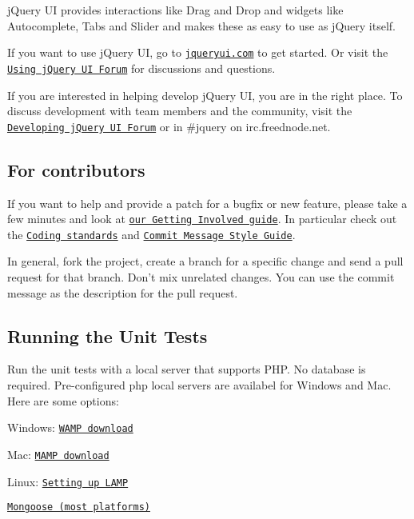 j\-Query U\-I provides interactions like Drag and Drop and widgets like Autocomplete, Tabs and Slider and makes these as easy to use as j\-Query itself.

If you want to use j\-Query U\-I, go to \href{http://jqueryui.com}{\tt jqueryui.\-com} to get started. Or visit the \href{http://forum.jquery.com/using-jquery-ui}{\tt Using j\-Query U\-I Forum} for discussions and questions.

If you are interested in helping develop j\-Query U\-I, you are in the right place. To discuss development with team members and the community, visit the \href{http://forum.jquery.com/developing-jquery-ui}{\tt Developing j\-Query U\-I Forum} or in \#jquery on irc.\-freednode.\-net.

\subsection*{For contributors }

If you want to help and provide a patch for a bugfix or new feature, please take a few minutes and look at \href{http://wiki.jqueryui.com/w/page/35263114/Getting-Involved}{\tt our Getting Involved guide}. In particular check out the \href{http://wiki.jqueryui.com/w/page/12137737/Coding-standards}{\tt Coding standards} and \href{http://wiki.jqueryui.com/w/page/25941597/Commit-Message-Style-Guide}{\tt Commit Message Style Guide}.

In general, fork the project, create a branch for a specific change and send a pull request for that branch. Don't mix unrelated changes. You can use the commit message as the description for the pull request.

\subsection*{Running the Unit Tests }

Run the unit tests with a local server that supports P\-H\-P. No database is required. Pre-\/configured php local servers are availabel for Windows and Mac. Here are some options\-:


\begin{DoxyItemize}
\item Windows\-: \href{http://www.wampserver.com/en/}{\tt W\-A\-M\-P download}
\item Mac\-: \href{http://www.mamp.info/en/index.html}{\tt M\-A\-M\-P download}
\item Linux\-: \href{https://www.linux.com/learn/tutorials/288158-easy-lamp-server-installation}{\tt Setting up L\-A\-M\-P}
\item \href{http://code.google.com/p/mongoose/}{\tt Mongoose (most platforms)}
\end{DoxyItemize}

